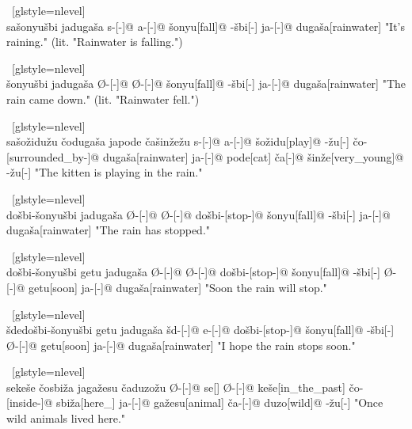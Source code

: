 \ex~[glstyle=nlevel]
\begingl 
\glpreamble {} \\ sa\v{s}onyu\v{s}bi jaduga\v{s}a
\endpreamble
s-[{\Ind}-]@
a-[{\Prog}-]@
\v{s}onyu[fall]@
-\v{s}bi[-{\Inan}]
ja-[{\Nom}-]@
duga\v{s}a[rainwater]
\glft "It's raining." (lit. "Rainwater is falling.")
\endgl
\xe

\ex~[glstyle=nlevel]
\begingl 
\glpreamble {} \\ \v{s}onyu\v{s}bi jaduga\v{s}a
\endpreamble
Ø-[{\Ind}-]@
Ø-[{\Pfv}-]@
\v{s}onyu[fall]@
-\v{s}bi[-{\Inan}]
ja-[{\Nom}-]@
duga\v{s}a[rainwater]
\glft "The rain came down." (lit. "Rainwater fell.")
\endgl
\xe

\ex~[glstyle=nlevel]
\begingl
\glpreamble {} \\ sa\v{s}o\v{z}idu\v{z}u \v{c}oduga\v{s}a japode \v{c}a\v{s}in\v{z}e\v{z}u
\endpreamble
s-[{\Ind}-]@
a-[{\Prog}-]@
\v{s}o\v{z}idu[play]@
-\v{z}u[-{\An}]
\v{c}o-[surrounded\_by-]@
duga\v{s}a[rainwater]
ja-[{\Nom}-]@
pode[cat]
\v{c}a[{\Nom}-]@
\v{s}in\v{z}e[very\_young]@
-\v{z}u[-{\An}]
\glft "The kitten is playing in the rain."
\endgl
\xe

\ex~[glstyle=nlevel]
\begingl 
\glpreamble {} \\ do\v{s}bi-\v{s}onyu\v{s}bi jaduga\v{s}a
\endpreamble
Ø-[{\Ind}-]@
Ø-[{\Pfv}-]@
do\v{s}bi-[stop-]@
\v{s}onyu[fall]@
-\v{s}bi[-{\Inan}]
ja-[{\Nom}-]@
duga\v{s}a[rainwater]
\glft "The rain has stopped."
\endgl
\xe

\ex~[glstyle=nlevel]
\begingl 
\glpreamble {} \\ do\v{s}bi-\v{s}onyu\v{s}bi getu jaduga\v{s}a
\endpreamble
Ø-[{\Ind}-]@
Ø-[{\Pfv}-]@
do\v{s}bi-[stop-]@
\v{s}onyu[fall]@
-\v{s}bi[-{\Inan}]
Ø-[{\Pfv}-]@
getu[soon]
ja-[{\Nom}-]@
duga\v{s}a[rainwater]
\glft "Soon the rain will stop."
\endgl
\xe

\ex~[glstyle=nlevel]
\begingl
\glpreamble {} \\ \v{s}dedo\v{s}bi-\v{s}onyu\v{s}bi getu jaduga\v{s}a
\endpreamble
\v{s}d-[{\Opt}-]@
e-[{\Pfv}-]@
do\v{s}bi-[stop-]@
\v{s}onyu[fall]@
-\v{s}bi[-{\Inan}]
Ø-[{\Pfv}-]@
getu[soon]
ja-[{\Nom}-]@
duga\v{s}a[rainwater]
\glft "I hope the rain stops soon."
\endgl
\xe

\ex~[glstyle=nlevel]
\begingl
\glpreamble {} \\ seke\v{s}e \v{c}osbi\v{z}a jaga\v{z}esu \v{c}aduzo\v{z}u
\endpreamble
Ø-[{\Ind}-]@
se[{\Cop}]
Ø-[{\Pfv}-]@
ke\v{s}e[in\_the\_past]
\v{c}o-[inside-]@
sbi\v{z}a[here\_]
ja-[{\Nom}-]@
ga\v{z}esu[animal]
\v{c}a-[{\Nom}-]@
duzo[wild]@
-\v{z}u[-{\An}]
\glft "Once wild animals lived here."
\endgl
\xe

